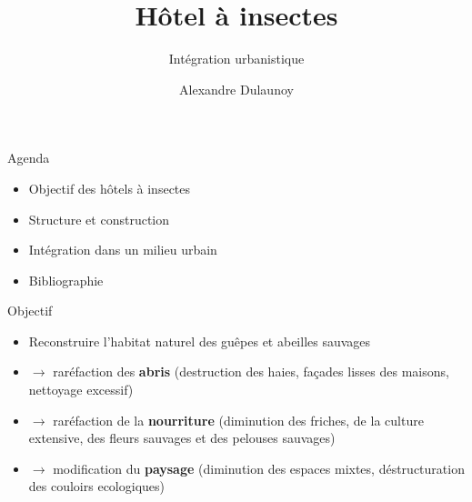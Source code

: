 \documentclass{beamer}
\begin{document}
\title{Hôtel à insectes}
\subtitle{Intégration urbanistique}
\author{Alexandre Dulaunoy}
\maketitle
\begin{frame}{Agenda}
    \begin{itemize}
        \item{Objectif des hôtels à insectes}
        \item{Structure et construction}
        \item{Intégration dans un milieu urbain}
        \item{Bibliographie}
    \end{itemize}
\end{frame}
\begin{frame}{Objectif}
    \begin{itemize}
        \item Reconstruire l'habitat naturel des guêpes et abeilles sauvages
        \item $\rightarrow$ raréfaction des {\bf abris} (destruction des haies, façades lisses des maisons, nettoyage excessif)
        \item $\rightarrow$ raréfaction de la {\bf nourriture} (diminution des friches, de la culture extensive, des fleurs sauvages et des pelouses sauvages)
        \item $\rightarrow$ modification du {\bf paysage} (diminution des espaces mixtes, déstructuration des couloirs ecologiques)
    \end{itemize}
\end{frame}
\end{document}
